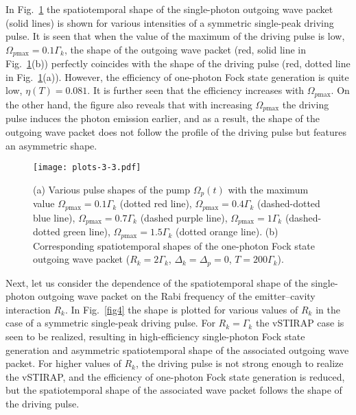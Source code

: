 \documentclass[pra, twocolumn]{revtex4}
\begin{document}
In Fig.~\ref{fig3}
%
the spatiotemporal shape of the
%
single-photon
outgoing wave packet
(solid lines)
is shown
for various intensities of
a symmetric single-peak driving pulse.
It is seen that
when the
value of the
maximum of the driving pulse
is low,
$\Omega_{p\mathrm{max}} = 0.1
\Gamma_k$,
the shape of the outgoing wave packet
(red, solid line in Fig.~\ref{fig3}(b)) perfectly coincides with the
%
shape
of the driving pulse
(red, dotted line in Fig.~\ref{fig3}(a)).
However, the efficiency of one-photon Fock state generation is quite
low,
$\eta(T)=0.081$.
%
It is further seen that the efficiency
%
increases with $\Omega_{p\mathrm{max}}$.
On the other hand, the
figure also reveals that with increasing
$\Omega_{p\mathrm{max}}$
the driving pulse induces the photon emission earlier,
and as a result, the shape of the outgoing wave packet
does not follow the profile of the driving pulse
%
but
features an asymmetric shape.

\begin{figure}[t!]
	\texttt{[image: plots-3-3.pdf]}
	\caption{
          (a)
          Various pulse shapes of the pump $\Omega_{p}(t)$
          with the maximum value
           $\Omega_{p\mathrm{max}} =
          0.1
\Gamma_k
          $ (dotted red line),  $\Omega_{p\mathrm{max}} = 0.4
\Gamma_k
          $
          (dashed-dotted blue line),
          $\Omega_{p\mathrm{max}} = 0.7
\Gamma_k
          $ (dashed purple line),
          $\Omega_{p\mathrm{max}} = 1
\Gamma_k
          $ (dashed-dotted green line),
          $\Omega_{p\mathrm{max}} = 1.5
\Gamma_k
          $ (dotted orange line).
          (b) Corresponding spatiotemporal shapes of the
%
          one-photon Fock state
          outgoing wave packet
          ($R_k = 2\Gamma_k$, $\Delta_k = \Delta_p = 0$, $T = 200 \Gamma_k$).
}
	\label{fig3}
\end{figure}

Next, let us consider the dependence of the spatiotemporal shape of the
%
single-photon
outgoing wave packet on the
Rabi frequency of the emitter--cavity interaction $R_k$.
In Fig.~\ref{fig4} the shape
is plotted
for various
values of $R_k$
in the case of a
symmetric
single-peak driving pulse.
For $R_k = \Gamma_k$ the
vSTIRAP case is seen to be realized, resulting in high-efficiency
single-photon Fock state generation and asymmetric spatiotemporal shape
of the associated outgoing wave packet.
For higher values of
$R_k$,
the driving pulse
is not strong enough to realize the
vSTIRAP, and
the efficiency of one-photon Fock state generation is reduced, but
the spatiotemporal shape of the associated wave packet follows
the shape of the driving pulse.
\end{document}
